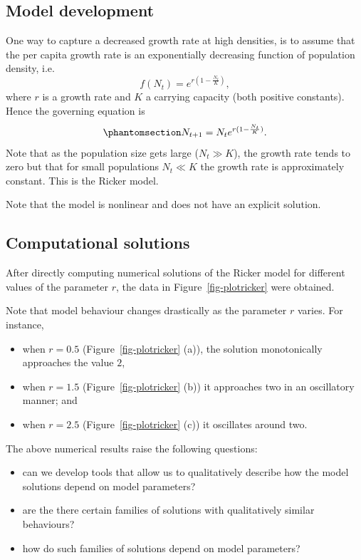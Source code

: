 \documentclass[
  letterpaper,
  DIV=11,
  numbers=noendperiod]{scrreprt}
\providecommand{\tightlist}{%
  \setlength{\itemsep}{0pt}\setlength{\parskip}{0pt}}
\begin{document}
\subsection{Model development}\label{model-development}

One way to capture a decreased growth rate at high densities, is to
assume that the per capita growth rate is an exponentially decreasing
function of population density, i.e.~ \[
f(N_t)=e^{r(1-\frac{N_t}{K})},
\] where \(r\) is a growth rate and \(K\) a carrying capacity (both
positive constants). Hence the governing equation is
\begin{equation}\protect\phantomsection\label{eq-RickerDefn1}{
N_{t+1}=N_te^{r(1-\frac{N_t}{K})}.
}\end{equation} Note that as the population size gets large
(\(N_t\gg K\)), the growth rate tends to zero but that for small
populations \(N_t\ll K\) the growth rate is approximately constant. This
is the Ricker model.

Note that the model is nonlinear and does not have an explicit solution.

\subsection{Computational solutions}\label{computational-solutions}

After directly computing numerical solutions of the Ricker model for
different values of the parameter \(r\), the data in
Figure~\ref{fig-plotricker} were obtained.

Note that model behaviour changes drastically as the parameter \(r\)
varies. For instance,

\begin{itemize}
\tightlist
\item
  when \(r=0.5\) (Figure~\ref{fig-plotricker} (a)), the solution
  monotonically approaches the value \(2\),
\item
  when \(r=1.5\) (Figure~\ref{fig-plotricker} (b)) it approaches two in
  an oscillatory manner; and
\item
  when \(r=2.5\) (Figure~\ref{fig-plotricker} (c)) it oscillates around
  two.
\end{itemize}

The above numerical results raise the following questions:

\begin{itemize}
\tightlist
\item
  can we develop tools that allow us to qualitatively describe how the
  model solutions depend on model parameters?
\item
  are the there certain families of solutions with qualitatively similar
  behaviours?
\item
  how do such families of solutions depend on model parameters?
\end{itemize}
\end{document}
